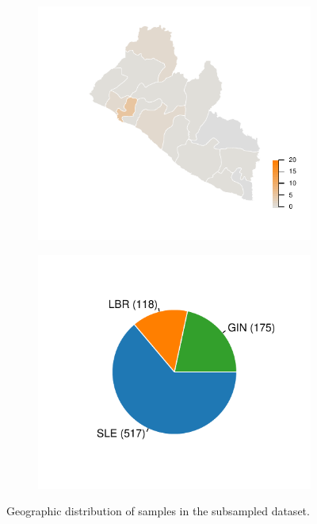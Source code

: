 \begin{figure}[!p]
\begin{subfigure}[b]{0.45\textwidth}
		\end{subfigure}		
		\\
		\begin{subfigure}[b]{0.45\textwidth}
			\centering
			\includegraphics[width=\columnwidth]{figures/special-subbig-geo-3}
		\end{subfigure}		
		\hfill
		\begin{subfigure}[b]{0.45\textwidth}
			\centering
			\includegraphics[width=\columnwidth]{figures/special-subbig-geo-4}
		\end{subfigure}		
		\caption{Geographic distribution of samples in the subsampled dataset.}
		\label{fig:seqdata_special-subbig_geo}
	\end{figure}


